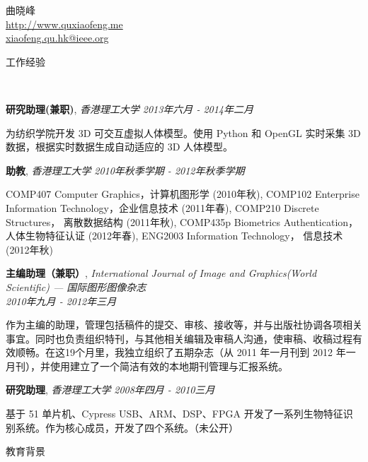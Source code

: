 \documentclass[9pt]{article}
\newenvironment{changemargin}[2]{%
  \begin{list}{}{%
    \setlength{\topsep}{0pt}%
    \setlength{\leftmargin}{#1}%
    \setlength{\rightmargin}{#2}%
    \setlength{\listparindent}{\parindent}%
    \setlength{\itemindent}{\parindent}%
    \setlength{\parsep}{\parskip}%
  }%
  \item[]}{\end{list}
}
\newcommand{\lineover}{
	\begin{changemargin}{-0.05in}{-0.05in}
		\vspace*{-8pt}
		\hrulefill \\
		\vspace*{-2pt}
	\end{changemargin}
}
\newcommand{\header}[1]{
	\begin{changemargin}{-0.5in}{-0.5in}
		\scshape{#1}\\
  	\lineover
	\end{changemargin}
}
\newcommand{\contact}[3]{
	\begin{changemargin}{-0.5in}{-0.5in}
		\begin{center}
			{\Large \scshape {#1}}\\ \smallskip
      {\url{#2}}\\ \smallskip 
      {\href{mailto:#3}{#3}}\\ \smallskip
		\end{center}
	\end{changemargin}
}
\newcommand{\jobtitle}[3]{
	\textbf{#1}, \emph{#2} \hfill \emph{#3}\\
}
\newcommand{\jobdescription}[1]{
	\begin{changemargin}{0.15in}{0.15in}
    \smallskip
		{#1}
    \medskip
	\end{changemargin}
}
\newenvironment{body} {
	\vspace*{-16pt}
	\begin{changemargin}{-0.25in}{-0.5in}
  }	
	{\end{changemargin}
}
\begin{document}
\contact{曲晓峰}{http://www.quxiaofeng.me}{xiaofeng.qu.hk@ieee.org}


\header{工作经验}

\begin{body}
  \vspace{14pt}

    \jobtitle{研究助理(兼职)}{香港理工大学}{2013年六月 - 2014年二月}
    \jobdescription{
        为纺织学院开发 3D 可交互虚拟人体模型。使用 Python 和 OpenGL 实时采集 3D 数据，根据实时数据生成自动适应的 3D 人体模型。
    }

    \jobtitle{助教}{香港理工大学}{2010年秋季学期 - 2012年秋季学期}
    \jobdescription {
        COMP407 Computer Graphics，计算机图形学 (2010年秋),
        COMP102 Enterprise Information Technology，企业信息技术 (2011年春), 
        COMP210 Discrete Structures， 离散数据结构 (2011年秋),
        COMP435p Biometrics Authentication， 人体生物特征认证 (2012年春), 
        ENG2003 Information Technology， 信息技术 (2012年秋)
    }

    \jobtitle{主编助理（兼职）}{International Journal of Image and Graphics(World Scientific) --- 国际图形图像杂志\\}{2010年九月 - 2012年三月}
    \jobdescription{
        作为主编的助理，管理包括稿件的提交、审核、接收等，并与出版社协调各项相关事宜。同时也负责组织特刊，与其他相关编辑及审稿人沟通，使审稿、收稿过程有效顺畅。在这19个月里，我独立组织了五期杂志（从 2011 年一月刊到 2012 年一月刊），并使用建立了一个简洁有效的本地期刊管理与汇报系统。
    }

	\jobtitle{研究助理}{香港理工大学}{2008年四月 - 2010三月}
    \jobdescription{
        基于 51 单片机、Cypress USB、ARM、DSP、FPGA 开发了一系列生物特征识别系统。作为核心成员，开发了四个系统。（未公开）
    }

\end{body}

\medskip


\header{教育背景}
\end{document}
